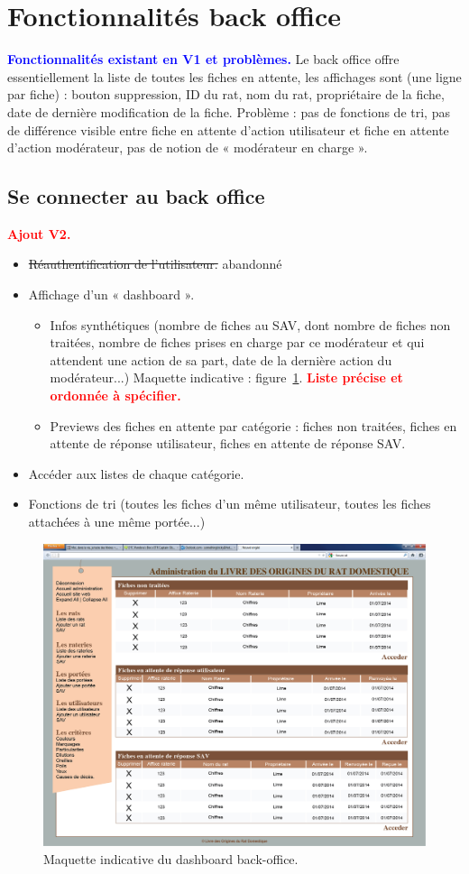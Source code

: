 \documentclass[a4paper,10pt]{article}
\newcommand\existant[1]{\noindent\textbf{\textcolor{blue}{#1}}}
\newcommand\desire[1]{\noindent\textbf{\textcolor{red}{#1}}}
\begin{document}
\section{Fonctionnalités back office}
\label{sec:backoffice}
\existant{Fonctionnalités existant en V1 et problèmes.} Le back office offre essentiellement la liste de toutes les fiches en attente, les affichages sont (une ligne par fiche) : bouton suppression, ID du rat, nom du rat, propriétaire de la fiche, date de dernière modification de la fiche. Problème : pas de fonctions de tri, pas de différence visible entre fiche en attente d'action utilisateur et fiche en attente d'action modérateur, pas de notion de « modérateur en charge ».  

\subsection{Se connecter au back office}
\desire{Ajout V2.} 
\begin{itemize}
\item \sout{Réauthentification de l'utilisateur.} abandonné 
\item Affichage d'un « dashboard ».
\begin{itemize}
\item Infos synthétiques (nombre de fiches au SAV, dont nombre de fiches non traitées, nombre de fiches prises en charge par ce modérateur et qui attendent une action de sa part, date de la dernière action du modérateur...) Maquette indicative : figure~\ref{fig:kerdashback}. \desire{Liste précise et ordonnée à spécifier.}
\item Previews des fiches en attente par catégorie : fiches non traitées, fiches en attente de réponse utilisateur, fiches en attente de réponse SAV.
\end{itemize}
\item Accéder aux listes de chaque catégorie.
\item Fonctions de tri (toutes les fiches d'un même utilisateur, toutes les fiches attachées à une même portée...)
\end{itemize}

\begin{figure}[htbp]%
\begin{center}\includegraphics[width=0.8\linewidth]{MaquetteSAV.jpg}\end{center}
\caption{Maquette indicative du dashboard back-office.\label{fig:kerdashback}}
\end{figure}
\end{document}
